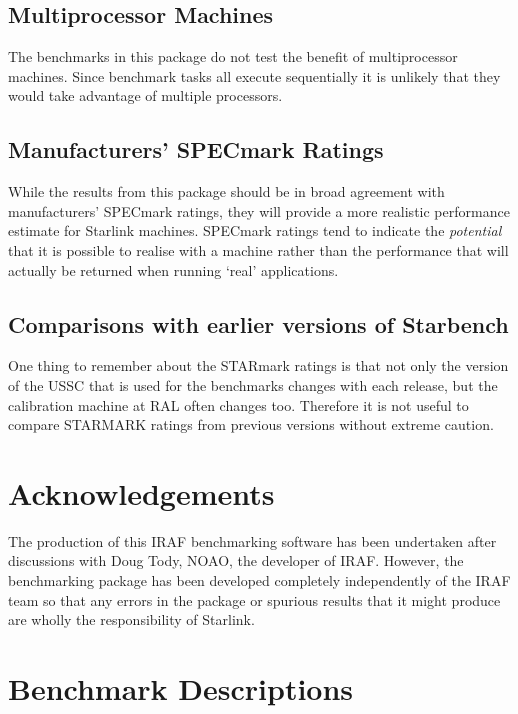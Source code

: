 \subsection{Multiprocessor Machines}

The benchmarks in this package do not test the benefit of multiprocessor
machines. Since benchmark tasks all execute sequentially it is unlikely
that they would take advantage of multiple processors.

\subsection{Manufacturers' SPECmark Ratings}

While the results from this package should be in broad agreement with
manufacturers' SPECmark ratings, they will provide a more realistic
performance estimate for Starlink machines. SPECmark ratings tend to
indicate the {\em potential} that it is possible to realise with a
machine rather than the performance that will actually be returned when
running `real' applications.

\subsection{Comparisons with earlier versions of Starbench}

One thing to remember about the STARmark ratings is that not only the
version of the USSC that is used for the benchmarks changes with each
release, but the calibration machine at RAL often changes too.  Therefore it
is not useful to compare STARMARK ratings from previous versions without
extreme caution.

\section{Acknowledgements}

The production of this IRAF benchmarking software has been undertaken
after discussions with Doug Tody, NOAO, the developer of IRAF.  However,
the benchmarking package has been developed completely independently of
the IRAF team so that any errors in the package or spurious results that
it might produce are wholly the responsibility of Starlink.

\newpage
\appendix
\section{Benchmark Descriptions}
\label{benchmark_descriptions}

